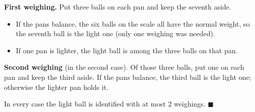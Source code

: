 \textbf{First weighing.} Put three balls on each pan and keep the seventh aside.
\begin{itemize}
\item If the pans balance, the six balls on the scale all have the normal weight, so the seventh ball is the light one (only one weighing was needed).
\item If one pan is lighter, the light ball is among the three balls on that pan.
\end{itemize}
\textbf{Second weighing} (in the second case). Of those three balls, put one on each pan and keep the third aside. If the pans balance, the third ball is the light one; otherwise the lighter pan holds it.

In every case the light ball is identified with at most $\boxed{2}$ weighings. $\blacksquare$
